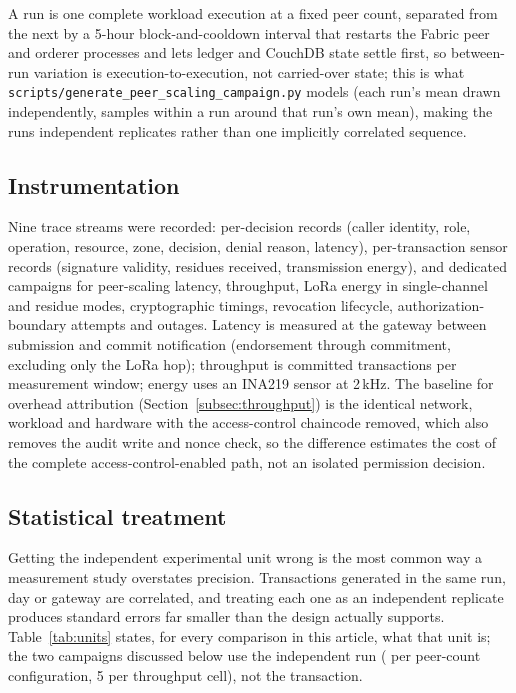 \documentclass[a4paper,fleqn]{cas-sc}
\begin{document}
A run is one complete workload execution at a fixed peer count, separated
from the next by a 5-hour block-and-cooldown interval that restarts the
Fabric peer and orderer processes and lets ledger and CouchDB state
settle first, so between-run variation is execution-to-execution, not
carried-over state; this is what
\texttt{scripts/generate\_peer\_scaling\_campaign.py} models (each run's
mean drawn independently, samples within a run around that run's own
mean), making the runs independent replicates rather than one implicitly
correlated sequence.

\subsection{Instrumentation}
\label{subsec:instrumentation}

Nine trace streams were recorded: per-decision records (caller identity,
role, operation, resource, zone, decision, denial reason, latency),
per-transaction sensor records (signature validity, residues received,
transmission energy), and dedicated campaigns for peer-scaling latency,
throughput, LoRa energy in single-channel and residue modes,
cryptographic timings, revocation lifecycle, authorization-boundary
attempts and outages. Latency is measured at the gateway between
submission and commit notification (endorsement through commitment,
excluding only the LoRa hop); throughput is committed transactions per
measurement window; energy uses an INA219 sensor at 2\,kHz. The baseline
for overhead attribution (Section~\ref{subsec:throughput}) is the
identical network, workload and hardware with the access-control
chaincode removed, which also removes the audit write and nonce check, so
the difference estimates the cost of the complete access-control-enabled
path, not an isolated permission decision.

\subsection{Statistical treatment}
\label{subsec:stats}

Getting the independent experimental unit wrong is the most common way a
measurement study overstates precision. Transactions generated in the same
run, day or gateway are correlated, and treating each one as an independent
replicate produces standard errors far smaller than the design actually
supports. Table~\ref{tab:units} states, for every comparison in this
article, what that unit is; the two campaigns discussed below use the
independent run (\PartRunsPerConfig{} per peer-count configuration, 5 per
throughput cell), not the transaction.
\end{document}
